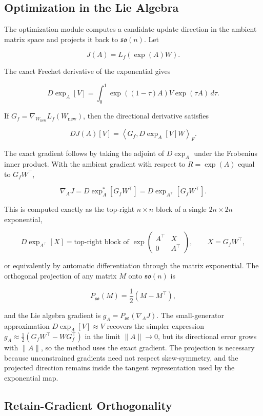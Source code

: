 \documentclass[
]{article}
\begin{document}
\subsection{Optimization in the Lie Algebra}\label{optimization-in-the-lie-algebra}

The optimization module computes a candidate update direction in the ambient matrix space and projects it back to \(\mathfrak{so}(n)\). Let

\[
J(A)=L_f(\exp(A)W).
\]

The exact Frechet derivative of the exponential gives

\[
D\exp_A[V]=\int_0^1 \exp((1-\tau)A)V\exp(\tau A)\,d\tau.
\]

If \(G_f=\nabla_{W_{\mathrm{new}}}L_f(W_{\mathrm{new}})\), then the directional derivative satisfies

\[
DJ(A)[V]
=\left\langle G_f, D\exp_A[V]W\right\rangle_F.
\]

The exact gradient follows by taking the adjoint of \(D\exp_A\) under the Frobenius inner product. With the ambient gradient with respect to \(R=\exp(A)\) equal to \(G_fW^\top\),

\[
\nabla_A J = D\exp_A^{*}[G_fW^\top]=D\exp_{A^\top}[G_fW^\top].
\]

This is computed exactly as the top-right \(n\times n\) block of a single \(2n\times 2n\) exponential,

\[
D\exp_{A^\top}[X]=\text{top-right block of }
\exp\begin{pmatrix}A^\top & X\\ 0 & A^\top\end{pmatrix},
\qquad X=G_fW^\top,
\]

or equivalently by automatic differentiation through the matrix exponential. The orthogonal projection of any matrix \(M\) onto \(\mathfrak{so}(n)\) is

\[
P_{\mathfrak{so}}(M)=\frac{1}{2}(M-M^\top),
\]

and the Lie algebra gradient is \(g_A=P_{\mathfrak{so}}(\nabla_A J)\). The small-generator approximation \(D\exp_A[V]\approx V\) recovers the simpler expression \(g_A\approx\frac{1}{2}(G_fW^\top-WG_f^\top)\) in the limit \(\|A\|\to 0\), but its directional error grows with \(\|A\|\), so the method uses the exact gradient. The projection is necessary because unconstrained gradients need not respect skew-symmetry, and the projected direction remains inside the tangent representation used by the exponential map.

\subsection{Retain-Gradient Orthogonality}\label{retain-gradient-orthogonality}
\end{document}
